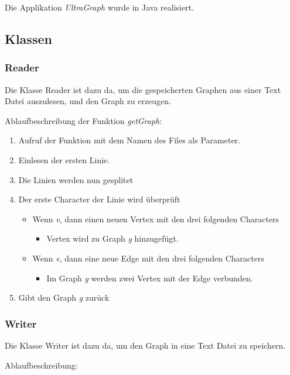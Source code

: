 \documentclass[a4paper,titlepage]{article}
\begin{document}
Die Applikation \emph{UltraGraph} wurde in Java realisiert.

\subsection{Klassen}

\subsubsection{Reader}

Die Klasse Reader ist dazu da, um die gespeicherten Graphen aus einer Text Datei auszulesen, und den Graph zu erzeugen.

Ablaufbeschreibung der Funktion \emph{getGraph}:

\begin{enumerate}
\item Aufruf der Funktion mit dem Namen des Files als Parameter.
\item Einlesen der ersten Linie.
\item Die Linien werden nun gesplitet
\item Der erste Character der Linie wird überprüft
\begin{itemize}\item Wenn \emph{v}, dann einen neuen Vertex mit den drei folgenden Characters
\begin{itemize}\item Vertex wird zu Graph \emph{g} hinzugefügt.\end{itemize}\end{itemize}
\begin{itemize}\item Wenn \emph{e}, dann eine neue Edge mit den drei folgenden Characters
\begin{itemize}\item Im Graph \emph{g} werden zwei Vertex mit der Edge verbunden.\end{itemize}\end{itemize}
\item Gibt den Graph \emph{g} zurück
\end{enumerate}

\subsubsection{Writer}

Die Klasse Writer ist dazu da, um den Graph in eine Text Datei zu speichern.

Ablaufbeschreibung:
\end{document}

